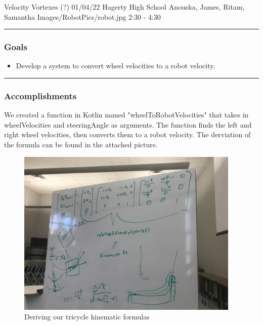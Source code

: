\insertmeeting 
	{Velocity Vortexes (?)} 
	{01/04/22} 
	{Hagerty High School}
	{Anouska, James, Ritam, Samantha}
	{Images/RobotPics/robot.jpg}
	{2:30 - 4:30}
	
\noindent\hfil\rule{\textwidth}{.4pt}\hfil
\subsubsection*{Goals}
\begin{itemize}
    \item Develop a system to convert wheel velocities to a robot velocity.

\end{itemize} 

\noindent\hfil\rule{\textwidth}{.4pt}\hfil

\subsubsection*{Accomplishments}
We created a function in Kotlin named "wheelToRobotVelocities" that takes in wheelVelocities and steeringAngle as arguments. The function finds the left and right wheel velocities, then converts them to a robot velocity. The derviation of the formula can be found in the attached picture. 


\begin{figure}[htp]
\centering
\includegraphics[width=0.95\textwidth, angle=0]{Meetings/January/01-04-22/SteeringAngletoHeadingFormula - Big Boik.JPG}
\caption{Deriving our tricycle kinematic formulas}
\label{fig:010422_1}
\end{figure}


